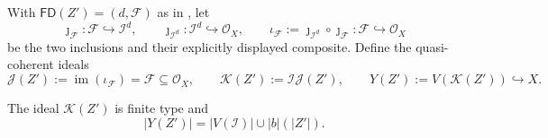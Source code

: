 \begin{definition}
  \label{def:nagata-composition-center-ideal}

  With $\mathsf{FD}(Z')=(d,\mathcal F)$ as in
  , let
  \[
    \jmath_{\mathcal F}\colon\mathcal F\hookrightarrow\mathcal I^d,
    \qquad
    \jmath_{\mathcal I^d}\colon\mathcal I^d\hookrightarrow\mathcal O_X,
    \qquad
    \iota_{\mathcal F}:=
      \jmath_{\mathcal I^d}\circ\jmath_{\mathcal F}\colon
      \mathcal F\hookrightarrow\mathcal O_X
  \]
  be the two inclusions and their explicitly displayed composite.  Define the
  quasi-coherent ideals
  \[
    \mathcal J(Z'):=\operatorname{im}(\iota_{\mathcal F})
      =\mathcal F\subseteq\mathcal O_X,
    \qquad
    \mathcal K(Z'):=\mathcal I\mathcal J(Z'),
    \qquad
    Y(Z'):=V(\mathcal K(Z'))\hookrightarrow X.
  \]
\end{definition}

\begin{lemma}
  \label{lemma:nagata-composition-center-ideal}

  The ideal $\mathcal K(Z')$ is finite type and
  \[
    |Y(Z')|=|V(\mathcal I)|\cup |b|(|Z'|).
  \]
\end{lemma}


